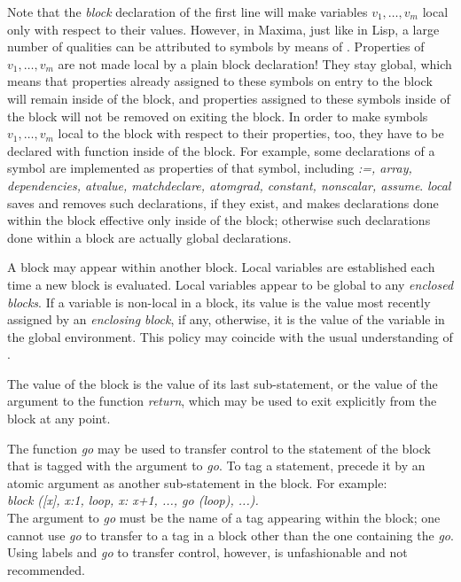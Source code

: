 \documentclass[../Maxima_Workbook.tex]{subfiles}
\begin{document}
\lz Note that the \emph{block} declaration of the first line will make variables \emph{$ v_1,\dots, v_m $} local only with respect to their values. However, in Maxima, just like in Lisp, a large number of qualities can be attributed to symbols by means of . Properties of \emph{$ v_1,\dots, v_m $} are not made local by a plain block declaration! They stay global, which means that properties already assigned to these symbols on entry to the block will remain inside of the block, and properties assigned to these symbols inside of the block will not be removed on exiting the block. In order to make symbols \emph{$ v_1,\dots, v_m $} local to the block with respect to their properties, too, they have to be declared with function  inside of the block. For example, some declarations of a symbol are implemented as properties of that symbol, including \emph{:=, array, dependencies, atvalue, matchdeclare, atomgrad, constant, nonscalar, assume}. \emph{local} saves and removes such declarations, if they exist, and makes declarations done within the block effective only inside of the block; otherwise such declarations done within a block are actually global declarations.

\lz A block may appear within another block. Local variables are established each time a new block is evaluated. Local variables appear to be global to any \emph{enclosed blocks}. If a variable is non-local in a block, its value is the value most recently assigned by an \emph{enclosing block}, if any, otherwise, it is the value of the variable in the global environment. This policy may coincide with the usual understanding of .

\lz The value of the block is the value of its last sub-statement, or the value of the argument to the function \emph{return}, which may be used to exit explicitly from the block at any point. 

\lz The function \emph{go} may be used to transfer control to the statement of the block that is tagged with the argument to \emph{go}. To tag a statement, precede it by an atomic argument as another sub-statement in the block. For example: \\
\emph{block ([x], x:1, loop, x: x+1, ..., go (loop), ...).} \\
The argument to \emph{go} must be the name of a tag appearing within the block; one cannot use \emph{go} to transfer to a tag in a block other than the one containing the \emph{go}. \\
Using labels and \emph{go} to transfer control, however, is unfashionable and not recommended.
\end{document}
